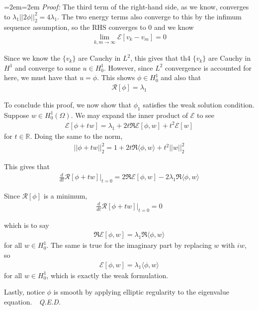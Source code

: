\documentclass{article}
\newcommand{\R}{{\mathbb{R}}}
\newcommand{ \norm }[1]{{ || {#1}||}}
\newenvironment{pf}{%
	\par%
	\medskip
	\leftskip=2em\rightskip=2em%
	\noindent\ignorespaces \textit{Proof:} \newline}{%
	\,\, \newline \textit{Q.E.D.}\par\medskip}
\begin{document}
\begin{pf}
		The third term of the right-hand side, as we know, converges to $\lambda_{1} \norm{2 \phi}_{2}^{2} = 4 \lambda_{1}$. The two energy terms also converge to this by the infimum sequence assumption, so the RHS converges to $0$ and we know 
		\begin{align*}
			\lim_{k,m \to \infty} \mathcal{E}[v_k - v_m] = 0
		\end{align*}
		
		Since we know the $\{v_{k}\}$ are Cauchy in $L^{2}$, this gives that th4 $\{v_{k}\}$ are Cauchy in $H^{1}$ and converge to some $u \in H^{1}_{0}$. However, since $L^{2}$ convergence is accounted for here, we must have that $u = \phi$. This shows $\phi \in H^{1}_{0}$ and also that 
		\begin{align*}
			\mathcal{R}[\phi] = \lambda_1
		\end{align*}
		
		\vspace{1cm}
		
		
		To conclude this proof, we now show that $\phi_1$ satisfies the weak solution condition. Suppose $w \in H^{1}_{0}(\Omega)$. We may expand the inner product of $\mathcal{E}$ to see 
		\begin{align*}
			\mathcal{E}[\phi + t w] = \lambda_1 + 2t \Re \mathcal{E}[\phi,w] + t^{2} \mathcal{E}[w]
		\end{align*}
		for $t \in \R$. Doing the same to the norm,
		\begin{align*}
			\norm{\phi + tw}_{2}^{2} = 1 + 2t \Re \langle \phi,w\rangle +t^{2}\norm{w}_{2}^{2}
		\end{align*}
		
		This gives that 
		\begin{align*}
			\frac{d}{dt}\mathcal{R}[\phi + tw]|_{t=0} = 2 \Re \mathcal{E}[\phi,w] - 2\lambda_{1} \Re \langle \phi,w\rangle 
		\end{align*}
		
		Since $\mathcal{R}[\phi]$ is a minimum, 
		\begin{align*}
			\frac{d}{dt} \mathcal{R}[\phi + tw]|_{t=0} = 0
		\end{align*}
		
		which is to say
		\begin{align*}
			\Re \mathcal{E}[\phi,w] = \lambda_{1} \Re \langle \phi,w\rangle 
		\end{align*}
		for all $w \in H^{1}_{0}$. The same is true for the imaginary part by replacing $w$ with $iw$, so 
		\begin{align*}
			\mathcal{E}[\phi,w] = \lambda_{1}\langle \phi,w\rangle 
		\end{align*}
		for all $w \in H^{1}_{0}$, which is exactly the weak formulation. 
		
		\vspace{1cm}
		
		Lastly, notice $\phi$ is smooth by applying elliptic regularity to the eigenvalue equation. 
	\end{pf}
	
\end{document}
